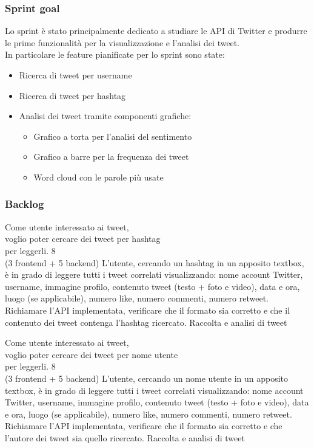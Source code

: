 \subsubsection{Sprint goal}
Lo sprint è stato principalmente dedicato a studiare le API di Twitter e produrre le prime funzionalità per la visualizzazione e l'analisi dei tweet.\\
In particolare le feature pianificate per lo sprint sono state:
\begin{itemize}
    \item Ricerca di tweet per username
    \item Ricerca di tweet per hashtag
    \item Analisi dei tweet tramite componenti grafiche:
    \begin{itemize}
        \item Grafico a torta per l'analisi del sentimento
        \item Grafico a barre per la frequenza dei tweet
        \item Word cloud con le parole più usate
    \end{itemize}
\end{itemize}


\subsubsection{Backlog}
\userstory%
{Come utente interessato ai tweet,\\voglio poter cercare dei tweet per hashtag\\per leggerli.}%
{8\\(3 frontend + 5 backend)}%
{L'utente, cercando un hashtag in un apposito textbox, è in grado di leggere tutti i tweet correlati visualizzando:
nome account Twitter, username, immagine profilo, contenuto tweet (testo + foto e video), data e ora, luogo (se applicabile), numero like, numero commenti, numero retweet.}%
{Richiamare l'API implementata, verificare che il formato sia corretto e che il contenuto dei tweet contenga l'hashtag ricercato.}
{Raccolta e analisi di tweet}

\userstory%
{Come utente interessato ai tweet,\\voglio poter cercare dei tweet per nome utente\\per leggerli.}%
{8\\(3 frontend + 5 backend)}%
{L'utente, cercando un nome utente in un apposito textbox, è in grado di leggere tutti i tweet correlati visualizzando:
nome account Twitter, username, immagine profilo, contenuto tweet (testo + foto e video), data e ora, luogo (se applicabile), numero like, numero commenti, numero retweet.}%
{Richiamare l'API implementata, verificare che il formato sia corretto e che l'autore dei tweet sia quello ricercato.}
{Raccolta e analisi di tweet}


